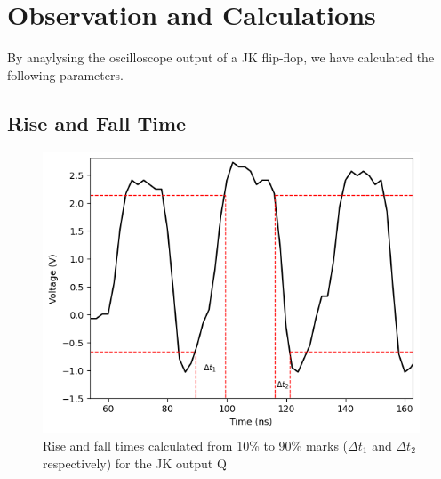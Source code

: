 \section{Observation and Calculations}
By anaylysing the oscilloscope output of a JK flip-flop, we have calculated the following parameters. 

\subsection*{Rise and Fall Time}

\begin{figure}[H]
    \centering
    \includegraphics[width=1\columnwidth]{images/risefall.png}
    \caption{Rise and fall times calculated from 10\% to 90\% marks ($\Delta t_1$ and $\Delta t_2$ respectively) for the JK output Q}
\end{figure}

